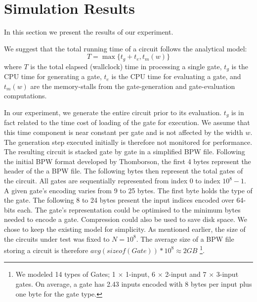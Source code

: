 \section{Simulation Results}
In this section we present the results of our experiment.
\par
We suggest that the total running time of a circuit follows the analytical model:
\begin{equation}
T = \max\{ t_g + t_e, t_m(w) \}
\end{equation}
where $T$ is the total elapsed (wallclock) time in processing a single gate, $t_g$ is the CPU time for generating a gate, $t_e$ is the CPU time for evaluating a gate, and $t_m(w)$ are the memory-stalls from the gate-generation and gate-evaluation computations.
\par
In our experiment, we generate the entire circuit prior to its evaluation. $t_g$ is in fact related to the time cost of loading of the gate for execution. We assume that this time component is near constant per gate and is not affected by the width $w$. The generation step executed initially is therefore not monitored for performance. The resulting circuit is stacked gate by gate in a simplified BPW file. Following the initial BPW format developed by Thomborson, the first 4 bytes represent the header of the a BPW file\cite{clark}. The following bytes then represent the total gates of the circuit. All gates are sequentially represented from index $0$ to index $10^8-1$. A given gate's encoding varies from 9 to 25 bytes. The first byte holds the type of the gate. The following 8 to 24 bytes present the input indices encoded over 64-bits each. The gate's representation could be optimised to the minimum bytes needed to encode a gate. Compression could also be used to save disk space. We chose to keep the existing model for simplicity. As mentioned earlier, the size of the circuits under test was fixed to $N = 10^8$. The average size of a BPW file storing a circuit is therefore $avg(sizeof(Gate)) * 10^8 \approx 2 GB$ \footnote{We modeled 14 types of Gates; 1 $\times$ 1-input, 6 $\times$ 2-input and 7 $\times$ 3-input gates. On average, a gate has 2.43 inputs encoded with 8 bytes per input plus one byte for the gate type.}.

